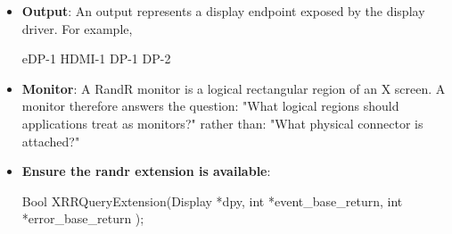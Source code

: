 \documentclass{report}
\begin{document}
\begin{itemize}
\begin{itemize}
\begin{itemize}
                        \item dimensions
                        \item visuals
                        \item colormaps
                        \item depth information
                    \end{itemize}
                    For example, 
                    \bigbreak \noindent 
                    \begin{bashcode}
                        DISPLAY=:0.0
                        DISPLAY=:0.1
                    \end{bashcode}
                    \bigbreak \noindent 
                    \begin{itemize}
                        \item :0     = X server/display
                        \item .0     = X screen 0
                        \item .1     = X screen 1
                    \end{itemize}
                    A window belongs to a particular screen. You cannot simply move an ordinary X window from screen 0's root window to screen 1's root window as though they were adjacent coordinates.
                \item \textbf{Output}: An output represents a display endpoint exposed by the display driver. For example,
                    \bigbreak \noindent 
                    \begin{bashcode}
                        eDP-1
                        HDMI-1
                        DP-1
                        DP-2
                    \end{bashcode}
                \item \textbf{Monitor}: A RandR monitor is a logical rectangular region of an X screen. A monitor therefore answers the question: "What logical regions should applications treat as monitors?" rather than: "What physical connector is attached?"
                \item \textbf{Ensure the randr extension is available}:
                    \bigbreak \noindent 
                    \begin{cppcode}
                        Bool XRRQueryExtension(Display *dpy,
                            int *event_base_return,
                            int *error_base_return
                        );
                    \end{cppcode}

\end{itemize}
\end{itemize}
\end{document}
